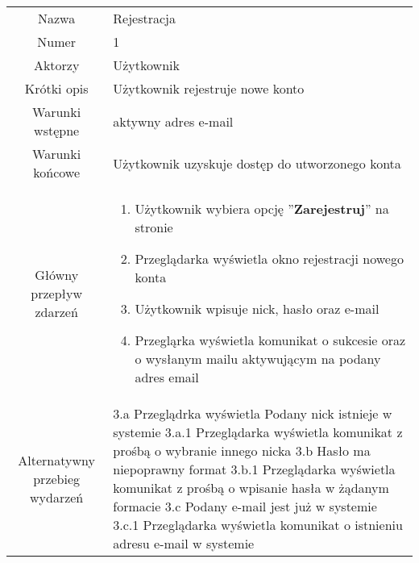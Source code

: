 \documentclass[a4paper]{article}
\begin{document}
\begin{tabular}{c p{10cm}}
Nazwa& Rejestracja	\\
Numer	& 1\\
Aktorzy & Użytkownik \\
Krótki opis & Użytkownik rejestruje nowe konto \\
Warunki wstępne&  aktywny adres e-mail\\
Warunki końcowe& Użytkownik uzyskuje dostęp do utworzonego konta\\
Główny przepływ zdarzeń&
\begin{enumerate} 
\item Użytkownik wybiera opcję ''\textbf{Zarejestruj}'' na stronie 
\item Przeglądarka wyświetla okno rejestracji nowego konta 
\item Użytkownik wpisuje nick, hasło oraz e-mail 
\item Przegląrka wyświetla komunikat o sukcesie oraz o wysłanym mailu aktywującym na podany adres email
\end{enumerate} \\
Alternatywny przebieg wydarzeń & 
3.a Przeglądrka wyświetla Podany nick istnieje w systemie \newline
3.a.1 Przeglądarka wyświetla komunikat z prośbą o wybranie innego nicka\newline
3.b Hasło ma niepoprawny format \newline
3.b.1 Przeglądarka wyświetla komunikat z prośbą o wpisanie hasła w żądanym formacie\newline
3.c Podany e-mail jest już w systemie \newline
3.c.1 Przeglądarka wyświetla komunikat o istnieniu adresu e-mail w systemie \newline
\\
\hline
\end{tabular}
\newline
\newline\\
\\
\end{document}
